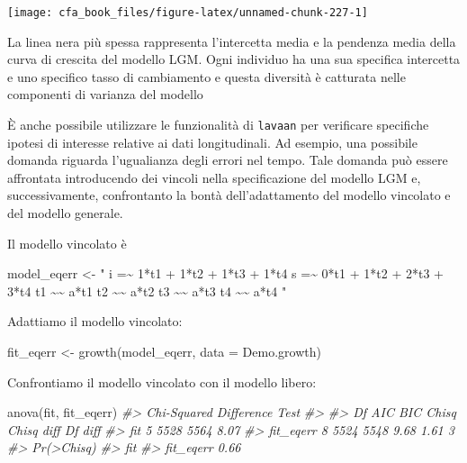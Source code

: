 \documentclass[
  11pt,
]{krantz}
\makeatletter
\newenvironment{Shaded}{\begin{snugshade}}{\end{snugshade}}
\newcommand{\AttributeTok}[1]{\textcolor[rgb]{0.61,0.61,0.61}{#1}}
\newcommand{\CommentTok}[1]{\textcolor[rgb]{0.37,0.37,0.37}{\textit{#1}}}
\newcommand{\FunctionTok}[1]{\textcolor[rgb]{0,0,0}{#1}}
\newcommand{\NormalTok}[1]{#1}
\newcommand{\OtherTok}[1]{\textcolor[rgb]{0.37,0.37,0.37}{#1}}
\newcommand{\StringTok}[1]{\textcolor[rgb]{0.5,0.5,0.5}{#1}}
\newenvironment{kframe}{%
\medskip{}
\setlength{\fboxsep}{.8em}
 \def\at@end@of@kframe{}%
 \ifinner\ifhmode%
  \def\at@end@of@kframe{\end{minipage}}%
  \begin{minipage}{\columnwidth}%
 \fi\fi%
 \def\FrameCommand##1{\hskip\@totalleftmargin \hskip-\fboxsep
 \colorbox{shadecolor}{##1}\hskip-\fboxsep
     \hskip-\linewidth \hskip-\@totalleftmargin \hskip\columnwidth}%
 \MakeFramed {\advance\hsize-\width
   \@totalleftmargin\z@ \linewidth\hsize
   \@setminipage}}%
 {\par\unskip\endMakeFramed%
 \at@end@of@kframe}
\renewenvironment{Shaded}{\begin{kframe}}{\end{kframe}}
\theoremstyle{definition}
\theoremstyle{definition}
\theoremstyle{definition}
\theoremstyle{definition}
\theoremstyle{remark}
\makeatother
\begin{document}
\begin{center}\texttt{[image: cfa\_book\_files/figure-latex/unnamed-chunk-227-1]} \end{center}

La linea nera più spessa rappresenta l'intercetta media e la pendenza media della curva di crescita del modello LGM. Ogni individuo ha una sua specifica intercetta e uno specifico tasso di cambiamento e questa diversità è catturata nelle componenti di varianza del modello

È anche possibile utilizzare le funzionalità di \texttt{lavaan} per verificare specifiche ipotesi di interesse relative ai dati longitudinali. Ad esempio, una possibile domanda riguarda l'ugualianza degli errori nel tempo. Tale domanda può essere affrontata introducendo dei vincoli nella specificazione del modello LGM e, successivamente, confrontanto la bontà dell'adattamento del modello vincolato e del modello generale.

Il modello vincolato è

\begin{Shaded}
\begin{Highlighting}[]
\NormalTok{model\_eqerr }\OtherTok{\textless{}{-}} \StringTok{"}
\StringTok{ i =\textasciitilde{} 1*t1 + 1*t2 + 1*t3 + 1*t4}
\StringTok{ s =\textasciitilde{} 0*t1 + 1*t2 + 2*t3 + 3*t4}
\StringTok{ t1 \textasciitilde{}\textasciitilde{} a*t1}
\StringTok{ t2 \textasciitilde{}\textasciitilde{} a*t2}
\StringTok{ t3 \textasciitilde{}\textasciitilde{} a*t3}
\StringTok{ t4 \textasciitilde{}\textasciitilde{} a*t4}
\StringTok{"}
\end{Highlighting}
\end{Shaded}

Adattiamo il modello vincolato:

\begin{Shaded}
\begin{Highlighting}[]
\NormalTok{fit\_eqerr }\OtherTok{\textless{}{-}} \FunctionTok{growth}\NormalTok{(model\_eqerr, }\AttributeTok{data =}\NormalTok{ Demo.growth)}
\end{Highlighting}
\end{Shaded}

Confrontiamo il modello vincolato con il modello libero:

\begin{Shaded}
\begin{Highlighting}[]
\FunctionTok{anova}\NormalTok{(fit, fit\_eqerr)}
\CommentTok{\#\textgreater{} Chi{-}Squared Difference Test}
\CommentTok{\#\textgreater{} }
\CommentTok{\#\textgreater{}           Df  AIC  BIC Chisq Chisq diff Df diff}
\CommentTok{\#\textgreater{} fit        5 5528 5564  8.07                   }
\CommentTok{\#\textgreater{} fit\_eqerr  8 5524 5548  9.68       1.61       3}
\CommentTok{\#\textgreater{}           Pr(\textgreater{}Chisq)}
\CommentTok{\#\textgreater{} fit                 }
\CommentTok{\#\textgreater{} fit\_eqerr       0.66}
\end{Highlighting}
\end{Shaded}
\end{document}
